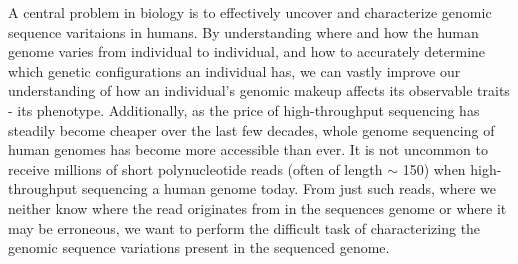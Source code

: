 A central problem in biology is to effectively uncover and characterize genomic sequence varitaions in humans.
By understanding where and how the human genome varies from individual to individual, and how to accurately determine which genetic configurations an individual has, we can vastly improve our understanding of how an individual's genomic makeup affects its observable traits - its phenotype.
Additionally, as the price of high-throughput sequencing has steadily become cheaper over the last few decades, whole genome sequencing of human genomes has become more accessible than ever.
It is not uncommon to receive millions of short polynucleotide reads (often of length $\sim$ 150) when high-throughput sequencing a human genome today.
From just such reads, where we neither know where the read originates from in the sequences genome or where it may be erroneous, we want to perform the difficult task of characterizing the genomic sequence variations present in the sequenced genome.


